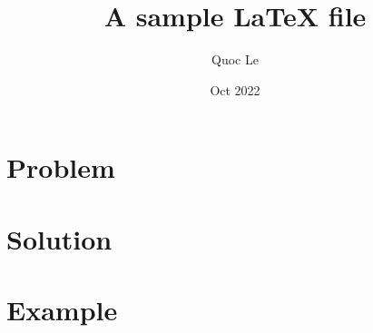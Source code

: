 \documentclass{article}
\title{A sample LaTeX file}
\author{Quoc Le}
\date{Oct 2022}
\begin{document}
\maketitle
\section{Problem} %
\label{sec:problem}
\section{Solution}
\label{sec:solution}
\section{Example}
\label{sec:example}
\end{document}
